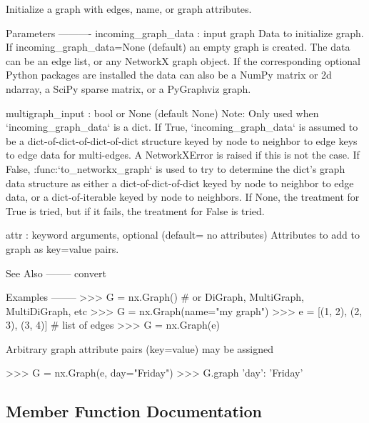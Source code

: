 \begin{DoxyVerb}Initialize a graph with edges, name, or graph attributes.

Parameters
----------
incoming_graph_data : input graph
    Data to initialize graph.  If incoming_graph_data=None (default)
    an empty graph is created.  The data can be an edge list, or any
    NetworkX graph object.  If the corresponding optional Python
    packages are installed the data can also be a NumPy matrix
    or 2d ndarray, a SciPy sparse matrix, or a PyGraphviz graph.

multigraph_input : bool or None (default None)
    Note: Only used when `incoming_graph_data` is a dict.
    If True, `incoming_graph_data` is assumed to be a
    dict-of-dict-of-dict-of-dict structure keyed by
    node to neighbor to edge keys to edge data for multi-edges.
    A NetworkXError is raised if this is not the case.
    If False, :func:`to_networkx_graph` is used to try to determine
    the dict's graph data structure as either a dict-of-dict-of-dict
    keyed by node to neighbor to edge data, or a dict-of-iterable
    keyed by node to neighbors.
    If None, the treatment for True is tried, but if it fails,
    the treatment for False is tried.

attr : keyword arguments, optional (default= no attributes)
    Attributes to add to graph as key=value pairs.

See Also
--------
convert

Examples
--------
>>> G = nx.Graph()  # or DiGraph, MultiGraph, MultiDiGraph, etc
>>> G = nx.Graph(name="my graph")
>>> e = [(1, 2), (2, 3), (3, 4)]  # list of edges
>>> G = nx.Graph(e)

Arbitrary graph attribute pairs (key=value) may be assigned

>>> G = nx.Graph(e, day="Friday")
>>> G.graph
{'day': 'Friday'}\end{DoxyVerb}
 

\subsection{Member Function Documentation}
\mbox{\label{classnetworkx_1_1classes_1_1multigraph_1_1MultiGraph_a239819819299de72e4dbd64f37d09710}} 

